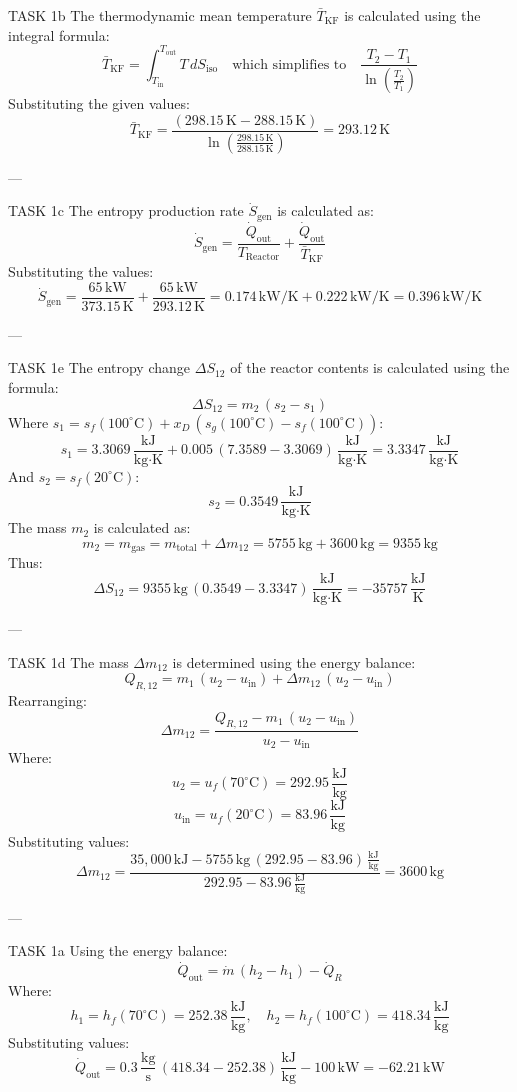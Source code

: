 TASK 1b  
The thermodynamic mean temperature \( \bar{T}_{\text{KF}} \) is calculated using the integral formula:  
\[
\bar{T}_{\text{KF}} = \int_{T_{\text{in}}}^{T_{\text{out}}} T \, dS_{\text{iso}} \quad \text{which simplifies to} \quad \frac{T_2 - T_1}{\ln \left( \frac{T_2}{T_1} \right)}
\]  
Substituting the given values:  
\[
\bar{T}_{\text{KF}} = \frac{(298.15 \, \text{K} - 288.15 \, \text{K})}{\ln \left( \frac{298.15 \, \text{K}}{288.15 \, \text{K}} \right)} = 293.12 \, \text{K}
\]

---

TASK 1c  
The entropy production rate \( \dot{S}_{\text{gen}} \) is calculated as:  
\[
\dot{S}_{\text{gen}} = \frac{\dot{Q}_{\text{out}}}{T_{\text{Reactor}}} + \frac{\dot{Q}_{\text{out}}}{\bar{T}_{\text{KF}}}
\]  
Substituting the values:  
\[
\dot{S}_{\text{gen}} = \frac{65 \, \text{kW}}{373.15 \, \text{K}} + \frac{65 \, \text{kW}}{293.12 \, \text{K}} = 0.174 \, \text{kW/K} + 0.222 \, \text{kW/K} = 0.396 \, \text{kW/K}
\]

---

TASK 1e  
The entropy change \( \Delta S_{12} \) of the reactor contents is calculated using the formula:  
\[
\Delta S_{12} = m_2 \, (s_2 - s_1)
\]  
Where \( s_1 = s_f(100^\circ\text{C}) + x_D \, (s_g(100^\circ\text{C}) - s_f(100^\circ\text{C})) \):  
\[
s_1 = 3.3069 \, \frac{\text{kJ}}{\text{kg·K}} + 0.005 \, (7.3589 - 3.3069) \, \frac{\text{kJ}}{\text{kg·K}} = 3.3347 \, \frac{\text{kJ}}{\text{kg·K}}
\]  
And \( s_2 = s_f(20^\circ\text{C}) \):  
\[
s_2 = 0.3549 \, \frac{\text{kJ}}{\text{kg·K}}
\]  
The mass \( m_2 \) is calculated as:  
\[
m_2 = m_{\text{gas}} = m_{\text{total}} + \Delta m_{12} = 5755 \, \text{kg} + 3600 \, \text{kg} = 9355 \, \text{kg}
\]  
Thus:  
\[
\Delta S_{12} = 9355 \, \text{kg} \, (0.3549 - 3.3347) \, \frac{\text{kJ}}{\text{kg·K}} = -35757 \, \frac{\text{kJ}}{\text{K}}
\]

---

TASK 1d  
The mass \( \Delta m_{12} \) is determined using the energy balance:  
\[
Q_{R,12} = m_1 \, (u_2 - u_{\text{in}}) + \Delta m_{12} \, (u_2 - u_{\text{in}})
\]  
Rearranging:  
\[
\Delta m_{12} = \frac{Q_{R,12} - m_1 \, (u_2 - u_{\text{in}})}{u_2 - u_{\text{in}}}
\]  
Where:  
\[
u_2 = u_f(70^\circ\text{C}) = 292.95 \, \frac{\text{kJ}}{\text{kg}}
\]  
\[
u_{\text{in}} = u_f(20^\circ\text{C}) = 83.96 \, \frac{\text{kJ}}{\text{kg}}
\]  
Substituting values:  
\[
\Delta m_{12} = \frac{35,000 \, \text{kJ} - 5755 \, \text{kg} \, (292.95 - 83.96) \, \frac{\text{kJ}}{\text{kg}}}{292.95 - 83.96 \, \frac{\text{kJ}}{\text{kg}}} = 3600 \, \text{kg}
\]

---

TASK 1a  
Using the energy balance:  
\[
\dot{Q}_{\text{out}} = \dot{m} \, (h_2 - h_1) - \dot{Q}_R
\]  
Where:  
\[
h_1 = h_f(70^\circ\text{C}) = 252.38 \, \frac{\text{kJ}}{\text{kg}}, \quad h_2 = h_f(100^\circ\text{C}) = 418.34 \, \frac{\text{kJ}}{\text{kg}}
\]  
Substituting values:  
\[
\dot{Q}_{\text{out}} = 0.3 \, \frac{\text{kg}}{\text{s}} \, (418.34 - 252.38) \, \frac{\text{kJ}}{\text{kg}} - 100 \, \text{kW} = -62.21 \, \text{kW}
\]
